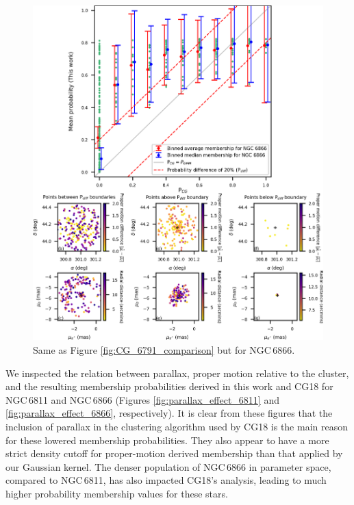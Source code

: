 \begin{figure}[hbtp]
    \centering
    \includegraphics[width=\linewidth]{Chapter4/NGC6866_CG_comparison.png}
    \caption[Comparison of membership probabilities for NGC\,6866]{Same as Figure \ref{fig:CG_6791_comparison} but for NGC\,6866.}
    \label{fig:CG_6866_comparison}
\end{figure}

We inspected the relation between parallax, proper motion relative to the cluster, and the resulting membership probabilities derived in this work and CG18 for NGC\,6811 and NGC\,6866 (Figures \ref{fig:parallax_effect_6811} and \ref{fig:parallax_effect_6866}, respectively). It is clear from these figures that the inclusion of parallax in the clustering algorithm used by CG18 is the main reason for these lowered membership probabilities. They also appear to have a more strict density cutoff for proper-motion derived membership than that applied by our Gaussian kernel. The denser population of NGC\,6866 in parameter space, compared to NGC\,6811, has also impacted CG18's analysis, leading to much higher probability membership values for these stars.

